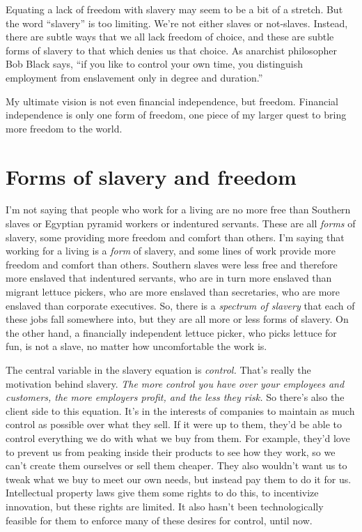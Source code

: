 Equating a lack of freedom with slavery may seem to be a bit of a stretch. But the word ``slavery'' is too limiting. We're not either slaves or not-slaves. Instead, there are subtle ways that we all lack freedom of choice, and these are subtle forms of slavery to that which denies us that choice. As anarchist philosopher Bob Black says, ``if you like to control your own time, you distinguish employment from enslavement only in degree and duration.''

My ultimate vision is not even financial independence, but freedom. Financial independence is only one form of freedom, one piece of my larger quest to bring more freedom to the world.

\section{Forms of slavery and freedom}
I'm not saying that people who work for a living are no more free than Southern slaves or Egyptian pyramid workers or indentured servants. These are all \emph{forms} of slavery, some providing more freedom and comfort than others. I'm saying that working for a living is a \emph{form} of slavery, and some lines of work provide more freedom and comfort than others. Southern slaves were less free and therefore more enslaved that indentured servants, who are in turn more enslaved than migrant lettuce pickers, who are more enslaved than secretaries, who are more enslaved than corporate executives. So, there is a \emph{spectrum of slavery} that each of these jobs fall somewhere into, but they are all more or less forms of slavery. On the other hand, a financially independent lettuce picker, who picks lettuce for fun, is not a slave, no matter how uncomfortable the work is.

The central variable in the slavery equation is \emph{control.} That's really the motivation behind slavery. \emph{The more control you have over your employees and customers, the more employers profit, and the less they risk.} So there's also the client side to this equation. It's in the interests of companies to maintain as much control as possible over what they sell. If it were up to them, they'd be able to control everything we do with what we buy from them. For example, they'd love to prevent us from peaking inside their products to see how they work, so we can't create them ourselves or sell them cheaper. They also wouldn't want us to tweak what we buy to meet our own needs, but instead pay them to do it for us. Intellectual property laws give them some rights to do this, to incentivize innovation, but these rights are limited. It also hasn't been technologically feasible for them to enforce many of these desires for control, until now.


